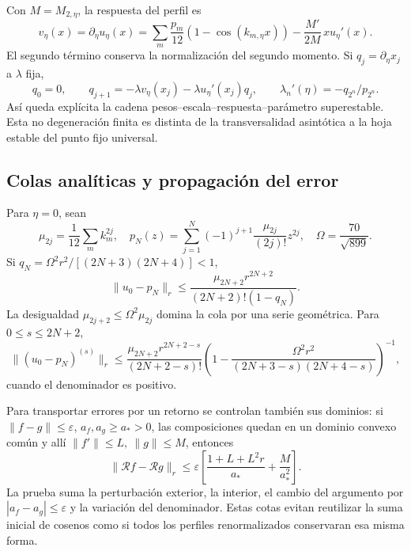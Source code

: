 Con \(M=M_{2,\eta}\), la respuesta del perfil es
\[
v_\eta(x)=\partial_\eta u_\eta(x)
=\sum_m\frac{p_m}{12}(1-\cos(k_{m,\eta}x))
-\frac{M'}{2M}\,x u_\eta'(x).
\]
El segundo término conserva la normalización del segundo momento. Si \(q_j=\partial_\eta x_j\) a \(\lambda\) fija,
\[
q_0=0,\qquad q_{j+1}=-\lambda v_\eta(x_j)-\lambda u_\eta'(x_j)q_j,
\qquad
\boxed{\lambda_n'(\eta)=-q_{2^n}/p_{2^n}}.
\]
Así queda explícita la cadena pesos–escala–respuesta–parámetro superestable. Esta no degeneración finita es distinta de la transversalidad asintótica a la hoja estable del punto fijo universal.


\subsection{Colas analíticas y propagación del error}
\label{hmtfg:desarrollo:9}

Para \(\eta=0\), sean
\[
\mu_{2j}=\frac1{12}\sum_mk_m^{2j},\quad
p_N(z)=\sum_{j=1}^N(-1)^{j+1}\frac{\mu_{2j}}{(2j)!}z^{2j},
\quad\Omega=\frac{70}{\sqrt{899}}.
\]
Si \(q_N=\Omega^2r^2/[(2N+3)(2N+4)]<1\),
\[
\|u_0-p_N\|_r\le
\frac{\mu_{2N+2}r^{2N+2}}{(2N+2)!(1-q_N)}.
\]
La desigualdad \(\mu_{2j+2}\le\Omega^2\mu_{2j}\) domina la cola por una serie geométrica. Para \(0\le s\le2N+2\),
\[
\|(u_0-p_N)^{(s)}\|_r\le
\frac{\mu_{2N+2}r^{2N+2-s}}{(2N+2-s)!}
\left(1-\frac{\Omega^2r^2}{(2N+3-s)(2N+4-s)}\right)^{-1},
\]
cuando el denominador es positivo.

Para transportar errores por un retorno se controlan también sus dominios: si \(\|f-g\|\le\varepsilon\), \(a_f,a_g\ge a_*>0\), las composiciones quedan en un dominio convexo común y allí \(\|f'\|\le L,\ \|g\|\le M\), entonces
\[
\|\mathcal Rf-\mathcal Rg\|_r
\le\varepsilon\left[\frac{1+L+L^2r}{a_*}+\frac{M}{a_*^2}\right].
\]
La prueba suma la perturbación exterior, la interior, el cambio del argumento por \(|a_f-a_g|\le\varepsilon\) y la variación del denominador. Estas cotas evitan reutilizar la suma inicial de cosenos como si todos los perfiles renormalizados conservaran esa misma forma.
